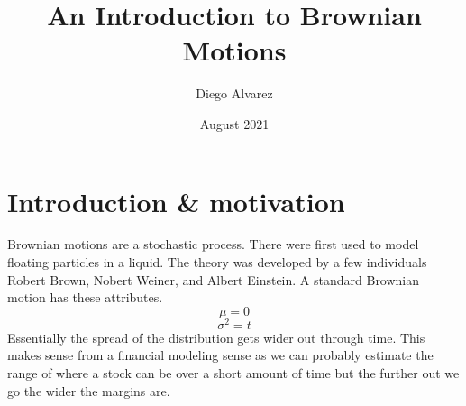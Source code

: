 \documentclass{article}
\title{An Introduction to Brownian Motions}
\author{Diego Alvarez}
\date{August 2021}
\begin{document}
\maketitle

\section*{Introduction \& motivation}

Brownian motions are a stochastic process. There were first used to model floating particles in a liquid. The theory was developed by a few individuals Robert Brown, Nobert Weiner, and Albert Einstein. 
\newline
\newline
A standard Brownian motion has these attributes. 
$$
\mu = 0
$$
$$
\sigma^2 = t
$$
Essentially the spread of the distribution gets wider out through time. This makes sense from a financial modeling sense as we can probably estimate the range of where a stock can be over a short amount of time but the further out we go the wider the margins are.
\end{document}
